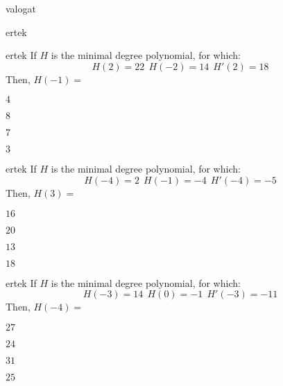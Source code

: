 \documentclass[12pt]{article}
\begin{document}
\begin{quiz}{valogat}
\begin{multi}{ertek}
\end{multi}
\begin{multi}{ertek}
If $H$ is the minimal degree polynomial, for which:
$$
H(2)=22 \ \  H(-2)=14 \ \ H'(2)=18
$$
Then, $H(-1)=$
\item* $ 4 $
\item  $ 8 $
\item  $ 7 $
\item  $ 3 $
\end{multi}
\begin{multi}{ertek}
If $H$ is the minimal degree polynomial, for which:
$$
H(-4)=2 \ \  H(-1)=-4 \ \ H'(-4)=-5
$$
Then, $H(3)=$
\item* $ 16 $
\item  $ 20 $
\item  $ 13 $
\item  $ 18 $
\end{multi}
\begin{multi}{ertek}
If $H$ is the minimal degree polynomial, for which:
$$
H(-3)=14 \ \  H(0)=-1 \ \ H'(-3)=-11
$$
Then, $H(-4)=$
\item* $ 27 $
\item  $ 24 $
\item  $ 31 $
\item  $ 25 $
\end{multi}
\end{quiz}
\end{document}
